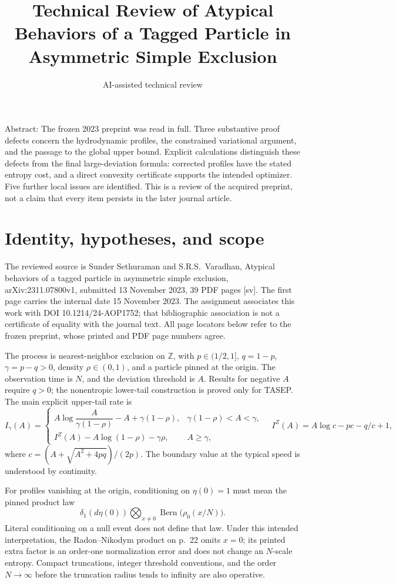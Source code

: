 \documentclass[10pt]{article}
\title{Technical Review of Atypical Behaviors of a Tagged Particle in Asymmetric Simple Exclusion}
\author{AI-assisted technical review}
\date{}
\begin{document}
\maketitle
Abstract: The frozen 2023 preprint was read in full. Three substantive proof defects concern the hydrodynamic profiles, the constrained variational argument, and the passage to the global upper bound. Explicit calculations distinguish these defects from the final large-deviation formula: corrected profiles have the stated entropy cost, and a direct convexity certificate supports the intended optimizer. Five further local issues are identified. This is a review of the acquired preprint, not a claim that every item persists in the later journal article.\par
\section*{Identity, hypotheses, and scope}
The reviewed source is Sunder Sethuraman and S.R.S. Varadhan, Atypical behaviors of a tagged particle in asymmetric simple exclusion, arXiv:2311.07800v1, submitted 13 November 2023, 39 PDF pages [sv]. The first page carries the internal date 15 November 2023. The assignment associates this work with DOI 10.1214/24-AOP1752; that bibliographic association is not a certificate of equality with the journal text. All page locators below refer to the frozen preprint, whose printed and PDF page numbers agree.\par
The process is nearest-neighbor exclusion on \(\mathbb Z\), with \(p\in(1/2,1]\), \(q=1-p\), \(\gamma=p-q>0\), density \(\rho\in(0,1)\), and a particle pinned at the origin. The observation time is \(N\), and the deviation threshold is \(A\). Results for negative \(A\) require \(q>0\); the nonentropic lower-tail construction is proved only for TASEP. The main explicit upper-tail rate is \[I_\gamma(A)=
 \begin{cases}
 A\log\!\dfrac{A}{\gamma(1-\rho)}-A+\gamma(1-\rho),
       &\gamma(1-\rho)<A<\gamma,\\[3pt]
 I^Z(A)-A\log(1-\rho)-\gamma\rho,&A\geq\gamma,
 \end{cases}
\quad
 I^Z(A)=A\log c-pc-q/c+1,\] where \(c=(A+\sqrt{A^2+4pq})/(2p)\). The boundary value at the typical speed is understood by continuity.\par
For profiles vanishing at the origin, conditioning on \(\eta(0)=1\) must mean the pinned product law \[\delta_1(d\eta(0))\bigotimes_{x\ne0}\operatorname{Bern}
       \bigl(\rho_0(x/N)\bigr).\] Literal conditioning on a null event does not define that law. Under this intended interpretation, the Radon–Nikodym product on p. 22 omits \(x=0\); its printed extra factor is an order-one normalization error and does not change an \(N\)-scale entropy. Compact truncations, integer threshold conventions, and the order \(N\to\infty\) before the truncation radius tends to infinity are also operative.\par
\end{document}
